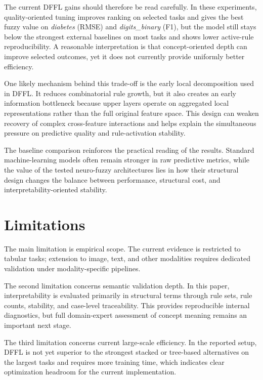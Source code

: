 \documentclass[runningheads]{llncs}
\begin{document}
The current DFFL gains should therefore be read carefully. In these experiments, quality-oriented tuning improves ranking on selected tasks and gives the best fuzzy value on \textit{diabetes} (RMSE) and \textit{digits\_binary} (F1), but the model still stays below the strongest external baselines on most tasks and shows lower active-rule reproducibility. A reasonable interpretation is that concept-oriented depth can improve selected outcomes, yet it does not currently provide uniformly better efficiency.

One likely mechanism behind this trade-off is the early local decomposition used in DFFL. It reduces combinatorial rule growth, but it also creates an early information bottleneck because upper layers operate on aggregated local representations rather than the full original feature space. This design can weaken recovery of complex cross-feature interactions and helps explain the simultaneous pressure on predictive quality and rule-activation stability.

The baseline comparison reinforces the practical reading of the results. Standard machine-learning models often remain stronger in raw predictive metrics, while the value of the tested neuro-fuzzy architectures lies in how their structural design changes the balance between performance, structural cost, and interpretability-oriented stability.

\section{Limitations}

The main limitation is empirical scope. The current evidence is restricted to tabular tasks; extension to image, text, and other modalities requires dedicated validation under modality-specific pipelines.

The second limitation concerns semantic validation depth. In this paper, interpretability is evaluated primarily in structural terms through rule sets, rule counts, stability, and case-level traceability. This provides reproducible internal diagnostics, but full domain-expert assessment of concept meaning remains an important next stage.

The third limitation concerns current large-scale efficiency. In the reported setup, DFFL is not yet superior to the strongest stacked or tree-based alternatives on the largest tasks and requires more training time, which indicates clear optimization headroom for the current implementation.
\end{document}
